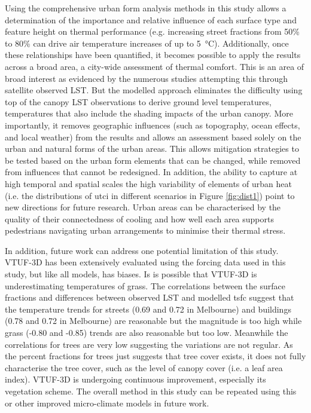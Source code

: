\documentclass[final,3p,times,authoryear]{elsarticle}
\begin{document}
Using the comprehensive urban form analysis methods in this study allows a determination of the importance and relative influence of each surface type and feature height on thermal performance (e.g. increasing street fractions from 50\% to 80\% can drive air temperature increases of up to 5\SI{}{\degreeCelsius}). Additionally, once these relationships have been quantified, it becomes possible to apply the results across a broad area, a city-wide assessment of thermal comfort. This is an area of broad interest as evidenced by the numerous studies attempting this through satellite observed LST. But the modelled approach eliminates the difficulty using top of the canopy LST observations to derive ground level temperatures, temperatures that also include the shading impacts of the urban canopy. More importantly, it removes geographic influences (such as topography, ocean effects, and local weather) from the results and allows an assessment based solely on the urban and natural forms of the urban areas. This allows mitigation strategies to be tested based on the urban form elements that can be changed, while removed from influences that cannot be redesigned. In addition, the ability to capture at high temporal and spatial scales the high variability of elements of urban heat (i.e. the distributions of \gls{utci} in different scenarios in Figure \ref{fig:dist1}) point to new directions for future research. Urban areas can be characterised by the quality of their connectedness of cooling and how well each area supports pedestrians navigating urban arrangements to minimise their thermal stress.

In addition, future work can address one potential limitation of this study. VTUF-3D has been extensively evaluated using the forcing data used in this study, but like all models, has biases. Is is possible that VTUF-3D is underestimating temperatures of grass. The correlations between the surface fractions and differences between observed LST and modelled \gls{tsfc} suggest that the temperature trends for streets (0.69 and 0.72 in Melbourne) and buildings (0.78 and 0.72 in Melbourne) are reasonable but the magnitude is too high while grass (-0.80 and -0.85) trends are also reasonable but too low. Meanwhile the correlations for trees are very low suggesting the variations are not regular. As the percent fractions for trees just suggests that tree cover exists, it does not fully characterise the tree cover, such as the level of canopy cover (i.e. a leaf area index). VTUF-3D is undergoing continuous improvement, especially its vegetation scheme. The overall method in this study can be repeated using this or other improved micro-climate models in future work. 
\end{document}
